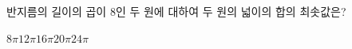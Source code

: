 반지름의 길이의 곱이 $8$인 두 원에 대하여 두 원의 넓이의 합의 최솟값은?
\begin{choices32}{$8\pi$}{$12\pi$}{$16\pi$}{$20\pi$}{$24\pi$}\end{choices32}
